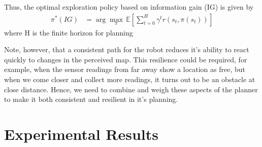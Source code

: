 \documentclass[letterpaper]{article} %
\begin{document}
Thus, the optimal exploration policy based on information gain (IG) is given by
\begin{align}
  \pi^*(IG) &= \arg\max_\pi \, \mathbb{E} \left[ \sum_{t=0}^{H} \gamma^t r(s_t, \pi(s_t)) \right]
  \label{eq:ig_policy}
\end{align}
where H is the finite horizon for planning


Note, however, that a consistent path for the robot reduces it’s ability to react quickly to changes in the perceived map. This resilience could be required, for example, when the sensor readings from far away show a location as free, but when we come closer and collect more readings, it turns out to be an obstacle at close distance. Hence, we need to combine and weigh these aspects of the planner to make it both consistent and resilient in it’s planning.







\section{Experimental Results}\label{sec:exp_results}



\end{document}

